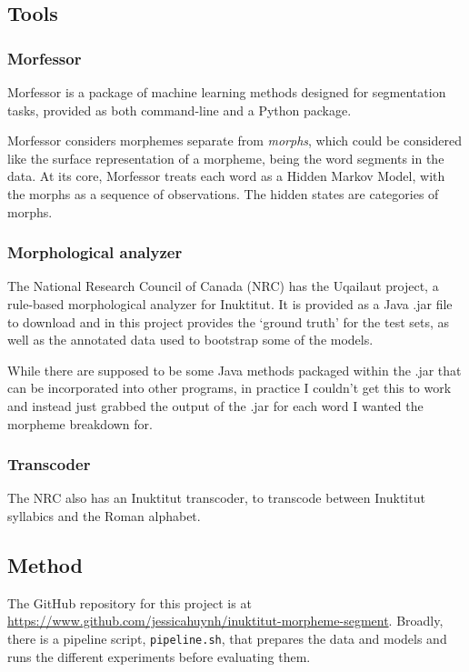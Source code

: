 \documentclass[10pt]{article}
\begin{document}
\subsection{Tools}

\subsubsection{Morfessor}
Morfessor\cite{morfessor} is a package of machine learning methods designed for segmentation tasks, provided as both command-line and a Python package.

Morfessor considers morphemes separate from \emph{morphs}, which could be considered like the surface representation of a morpheme, being the word segments in the data. At its core, Morfessor treats each word as a Hidden Markov Model, with the morphs as a sequence of observations. The hidden states are categories of morphs.\cite{formula}

\subsubsection{Morphological analyzer}
The National Research Council of Canada (NRC) has the Uqailaut project, a rule-based morphological analyzer for Inuktitut.\cite{analyzer} It is provided as a Java .jar file to download and in this project provides the `ground truth' for the test sets, as well as the annotated data used to bootstrap some of the models.

While there are supposed to be some Java methods packaged within the .jar that can be incorporated into other programs, in practice I couldn't get this to work and instead just grabbed the output of the .jar for each word I wanted the morpheme breakdown for.\cite{exec_cmd_java}

\subsubsection{Transcoder}
The NRC also has an Inuktitut transcoder, to transcode between Inuktitut syllabics and the Roman alphabet.\cite{transcoder}

\subsection{Method}
The GitHub repository for this project is at \url{https://www.github.com/jessicahuynh/inuktitut-morpheme-segment}. Broadly, there is a pipeline script, \texttt{pipeline.sh}, that prepares the data and models and runs the different experiments before evaluating them.
\end{document}
